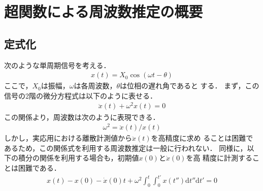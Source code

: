\documentclass[usejistfm]{sice}
\begin{document}
\section{超関数による周波数推定の概要}
\subsection{定式化}
次のような単周期信号を考える．
\begin{align}
 x(t)=X_0\cos (\omega t- \theta)
\label{eq:a}
\end{align}
ここで，$X_0$は振幅，$\omega$は各周波数，$\theta$は位相の遅れ角であると
する．
%
まず，この信号の2階の微分方程式は以下のように表せる．
\begin{align}
 \ddot{x}(t)+\omega^2x(t)=0
\label{eq:b}
\end{align}
この関係より，周波数は次のように表現できる．
\begin{align}
 \omega^2=\ddot{x}(t)/x(t)
\label{eq:c}
\end{align}
しかし，実応用における離散計測値から$\ddot{x}(t)$を高精度に求め
ることは困難であるため，この関係式を利用する周波数推定は一般に行われない．
同様に，以下の積分の関係を利用する場合も，初期値$x(0)$と$\dot{x}(0)$を高
精度に計測することは困難である．
\begin{align}
x(t)-x(0)-\dot{x}(0)t+\omega^2\int^t_0\int^{t'}_0x(t'') \mbox{d}t''\mbox{d}t'=0
\label{eq:d}
\end{align}
\end{document}
